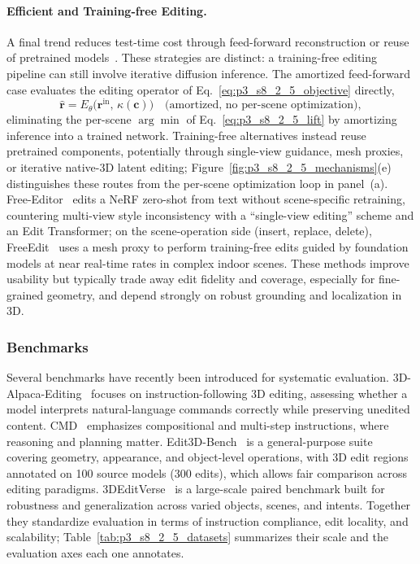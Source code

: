 \paragraph{Efficient and Training-free Editing.}
A final trend reduces test-time cost through feed-forward reconstruction or reuse of pretrained models~\cite{erkocc2025preditor3d,li2025voxhammer}. These strategies are distinct: a training-free editing pipeline can still involve iterative diffusion inference. The amortized feed-forward case evaluates the editing operator of Eq.~\eqref{eq:p3_s8_2_5_objective} directly,
\begin{equation}
\hat{\mathbf{r}} = E_\theta\big(\mathbf{r}^{\text{in}},\,\kappa(\mathbf{c})\big) \quad \text{(amortized, no per-scene optimization)},
\label{eq:p3_s8_2_5_ff}
\end{equation}
eliminating the per-scene $\arg\min$ of Eq.~\eqref{eq:p3_s8_2_5_lift} by amortizing inference into a trained network. Training-free alternatives instead reuse pretrained components, potentially through single-view guidance, mesh proxies, or iterative native-3D latent editing; Figure~\ref{fig:p3_s8_2_5_mechanisms}(e) distinguishes these routes from the per-scene optimization loop in panel~(a).
Free-Editor~\cite{karim2024freeeditor} edits a NeRF zero-shot from text without scene-specific retraining, countering multi-view style inconsistency with a ``single-view editing'' scheme and an Edit Transformer; on the scene-operation side (insert, replace, delete), FreeEdit~\cite{madhavaram2025towardsTrainingFree} uses a mesh proxy to perform training-free edits guided by foundation models at near real-time rates in complex indoor scenes.
These methods improve usability but typically trade away edit fidelity and coverage, especially for fine-grained geometry, and depend strongly on robust grounding and localization in 3D.


\subsubsection{Benchmarks}
\label{subsubsec:p3_s8_2_5_benchmarks}

Several benchmarks have recently been introduced for systematic evaluation.
3D-Alpaca-Editing~\cite{ye2025shapellmOmni} focuses on instruction-following 3D editing, assessing whether a model interprets natural-language commands correctly while preserving unedited content.
CMD~\cite{li2025cmd} emphasizes compositional and multi-step instructions, where reasoning and planning matter.
Edit3D-Bench~\cite{li2025voxhammer} is a general-purpose suite covering geometry, appearance, and object-level operations, with 3D edit regions annotated on 100 source models (300 edits), which allows fair comparison across editing paradigms.
3DEditVerse~\cite{xia2025towardsConsistent} is a large-scale paired benchmark built for robustness and generalization across varied objects, scenes, and intents.
Together they standardize evaluation in terms of instruction compliance, edit locality, and scalability; Table~\ref{tab:p3_s8_2_5_datasets} summarizes their scale and the evaluation axes each one annotates.

